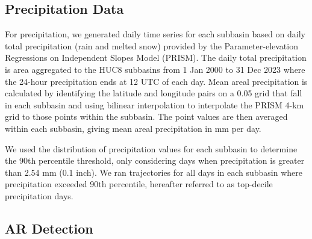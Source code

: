 \documentclass[draft]{agujournal2019}
\begin{document}

\subsection{Precipitation Data}

For precipitation, we generated daily time series for each subbasin based on daily total precipitation (rain and melted snow) provided by the Parameter-elevation Regressions on Independent Slopes Model (PRISM). The daily total precipitation is area aggregated to the HUC8 subbasins from 1 Jan 2000 to 31 Dec 2023 where the 24-hour precipitation ends at 12 UTC of each day. Mean areal precipitation is calculated by identifying the latitude and longitude pairs on a 0.05\textdegree{} grid that fall in each subbasin and using bilinear interpolation to interpolate the PRISM 4-km grid to those points within the subbasin. The point values are then averaged within each subbasin, giving mean areal precipitation in mm per day. 


We used the distribution of precipitation values for each subbasin to determine the 90th percentile threshold, only considering days when precipitation is greater than 2.54 mm (0.1 inch). We ran trajectories for all days in each subbasin where precipitation exceeded 90th percentile, hereafter referred to as top-decile precipitation days.


\subsection{AR Detection}
\end{document}
